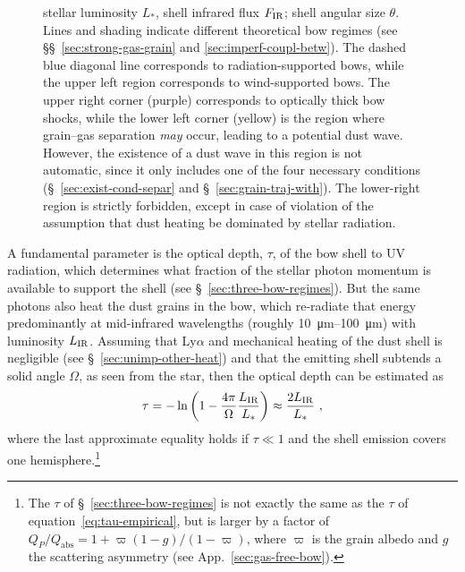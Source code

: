 \begin{figure}
{    stellar luminosity \(L_*\), shell infrared flux \(F_{\text{IR}}\); shell
    angular size \(\theta\).  Lines and shading indicate different
    theoretical bow regimes (see \S\S~\ref{sec:strong-gas-grain} and
    \ref{sec:imperf-coupl-betw}).  The dashed blue diagonal line
    corresponds to radiation-supported bows, while the upper left
    region corresponds to wind-supported bows.  The upper right corner
    (purple) corresponds to optically thick bow shocks, while the
    lower left corner (yellow) is the region where grain--gas
    separation \textit{may} occur, leading to a potential dust wave.
    However, the existence of a dust wave in this region is not
    automatic, since it only includes one of the four necessary
    conditions (\S~\ref{sec:exist-cond-separ} and
    \S~\ref{sec:grain-traj-with}). The lower-right region is strictly
    forbidden, except in case of violation of the assumption that dust
    heating be dominated by stellar radiation. }
  \label{fig:All-sources-eta-tau}
\end{figure}


A fundamental parameter is the optical depth, \(\tau\), of the bow
shell to UV radiation, which determines what fraction of the stellar
photon momentum is available to support the shell (see
\S~\ref{sec:three-bow-regimes}).  But the same photons also heat the
dust grains in the bow, which re-radiate that energy predominantly at
mid-infrared wavelengths (roughly \SIrange{10}{100}{\um}) with
luminosity \(L_{\text{IR}}\).  Assuming that Ly\(\alpha\) and mechanical
heating of the dust shell is negligible (see
\S~\ref{sec:unimp-other-heat}) and that the emitting shell subtends a
solid angle \(\Omega\), as seen from the star, then the optical depth
can be estimated as
\begin{equation}
  \label{eq:tau-empirical}
  \tau = -\ln \left( 1 - \frac{4\pi}{\Omega} \frac{L_{\text{IR}}}{L_*} \right)
  \approx \frac{2 L_{\text{IR}}}{L_*} \ ,
\end{equation}
where the last approximate equality holds if \(\tau \ll 1\) and the
shell emission covers one hemisphere.\footnote{%
  The \(\tau\) of \S~\ref{sec:three-bow-regimes} is not exactly the
  same as the \(\tau\) of equation~\eqref{eq:tau-empirical}, but is
  larger by a factor of
  \(Q_P / Q_{\text{abs}} = 1 + \varpi (1 - g)/(1 - \varpi)\), where
  \(\varpi\) is the grain albedo and \(g\) the scattering asymmetry
  (see App.~\ref{sec:gas-free-bow}).} %

